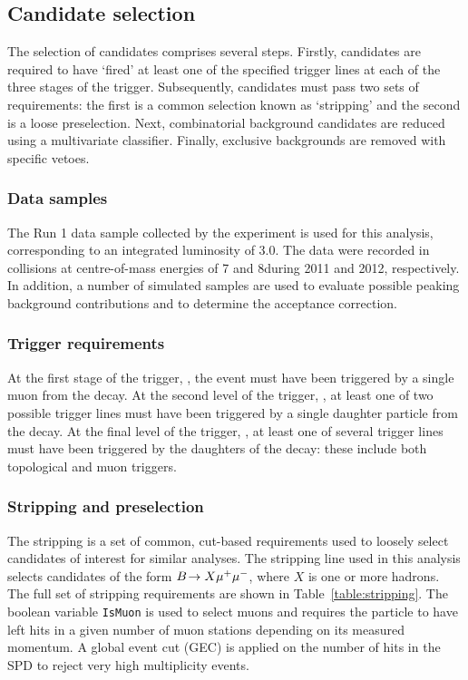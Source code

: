 \subsection{Candidate selection}
\label{sec:kpimm:selection}

The selection of \BdToKpimm candidates comprises several steps. Firstly, candidates are required to have `fired' at least one of the specified trigger lines at each of the three stages of the trigger. Subsequently, candidates must pass two sets of requirements: the first is a common selection known as `stripping' and the second is a loose preselection. Next, combinatorial background candidates are reduced using a multivariate classifier. Finally, exclusive backgrounds are removed with specific vetoes.

\subsubsection{Data samples}

The Run 1 data sample collected by the \lhcb experiment is used for this analysis, corresponding to an integrated luminosity of 3.0\invfb. The data were recorded in \proton\proton collisions at centre-of-mass energies of 7 and 8\tev during 2011 and 2012, respectively. In addition, a number of simulated samples are used to evaluate possible peaking background contributions and to determine the acceptance correction.

\subsubsection{Trigger requirements}

At the first stage of the trigger, \lone, the event must have been triggered by a single muon from the \BdToKpimm decay. At the second level of the trigger, \hltone, at least one of two possible trigger lines must have been triggered by a single daughter particle from the \BdToKpimm decay. At the final level of the trigger, \hlttwo, at least one of several trigger lines must have been triggered by the daughters of the \BdToKpimm decay: these include both topological and muon triggers.

\subsubsection{Stripping and preselection}

The stripping is a set of common, cut-based requirements used to loosely select candidates of interest for similar analyses. The stripping line used in this analysis selects candidates of the form ${B}\!\rightarrow X{\mu^+\mu^-}$, where $X$ is one or more hadrons. The full set of stripping requirements are shown in Table~\ref{table:stripping}. The boolean variable \texttt{IsMuon} is used to select muons and requires the particle to have left hits in a given number of muon stations depending on its measured momentum. A global event cut (GEC) is applied on the number of hits in the SPD to reject very high multiplicity events. 

